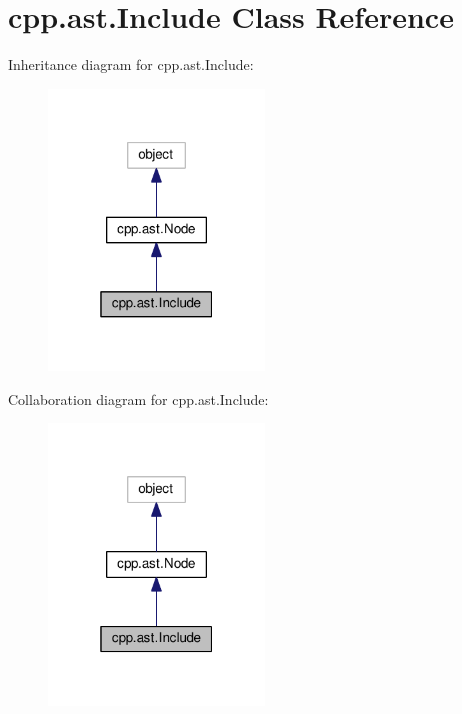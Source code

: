 \hypertarget{classcpp_1_1ast_1_1Include}{}\section{cpp.\+ast.\+Include Class Reference}
\label{classcpp_1_1ast_1_1Include}


Inheritance diagram for cpp.\+ast.\+Include\+:
\nopagebreak
\begin{figure}[H]
\begin{center}
\leavevmode
\includegraphics[width=163pt]{classcpp_1_1ast_1_1Include__inherit__graph}
\end{center}
\end{figure}


Collaboration diagram for cpp.\+ast.\+Include\+:
\nopagebreak
\begin{figure}[H]
\begin{center}
\leavevmode
\includegraphics[width=163pt]{classcpp_1_1ast_1_1Include__coll__graph}
\end{center}
\end{figure}
